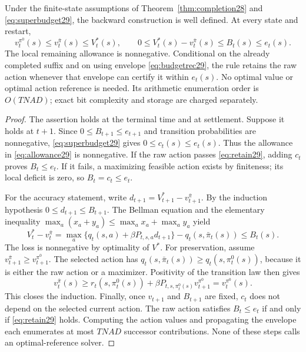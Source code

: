 \begin{theorem}\label{thm:budget29}
Under the finite-state assumptions of Theorem~\ref{thm:completion28} and \eqref{eq:superbudget29}, the backward construction is well defined. At every state and restart,
\begin{equation}\label{eq:budgetguarantee29}
 v_t^{\pi^0}(s)\le v_t^{\bar\pi}(s)\le V_t^*(s),\qquad
 0\le V_t^*(s)-v_t^{\bar\pi}(s)\le B_t(s)\le e_t(s).
\end{equation}
The local remaining allowance is nonnegative. Conditional on the already completed suffix and on using envelope \eqref{eq:budgetrec29}, the rule retains the raw action whenever that envelope can certify it within $e_t(s)$. No optimal value or optimal action reference is needed. Its arithmetic enumeration order is $O(TNAD)$; exact bit complexity and storage are charged separately.
\end{theorem}
\begin{proof}
The assertion holds at the terminal time and at settlement. Suppose it holds at $t+1$. Since $0\le B_{t+1}\le e_{t+1}$ and transition probabilities are nonnegative, \eqref{eq:superbudget29} gives $0\le c_t(s)\le e_t(s)$. Thus the allowance in \eqref{eq:allowance29} is nonnegative. If the raw action passes \eqref{eq:retain29}, adding $c_t$ proves $B_t\le e_t$. If it fails, a maximizing feasible action exists by finiteness; its local deficit is zero, so $B_t=c_t\le e_t$.

For the accuracy statement, write $d_{t+1}=V_{t+1}^*-v_{t+1}^{\bar\pi}$. By the induction hypothesis $0\le d_{t+1}\le B_{t+1}$. The Bellman equation and the elementary inequality $\max_a(x_a+y_a)\le\max_a x_a+\max_a y_a$ yield
\[
 V_t^*-v_t^{\bar\pi}
 =\max_a\{q_t(s,a)+\beta P_{t,s,a}d_{t+1}\}-q_t(s,\bar\pi_t(s))
 \le B_t(s).
\]
The loss is nonnegative by optimality of $V^*$. For preservation, assume $v_{t+1}^{\bar\pi}\ge v_{t+1}^{\pi^0}$. The selected action has $q_t(s,\bar\pi_t(s))\ge q_t(s,\pi_t^0(s))$, because it is either the raw action or a maximizer. Positivity of the transition law then gives
\[
 v_t^{\bar\pi}(s)\ge r_t(s,\pi_t^0(s))+\beta P_{t,s,\pi_t^0(s)}v_{t+1}^{\pi^0}=v_t^{\pi^0}(s).
\]
This closes the induction. Finally, once $v_{t+1}$ and $B_{t+1}$ are fixed, $c_t$ does not depend on the selected current action. The raw action satisfies $B_t\le e_t$ if and only if \eqref{eq:retain29} holds. Computing the action values and propagating the envelope each enumerates at most $TNAD$ successor contributions. None of these steps calls an optimal-reference solver.
\end{proof}

